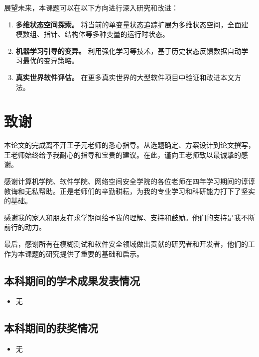 \documentclass[bachelor]{njupthesis}
\begin{document}
展望未来，本课题可以在以下方向进行深入研究和改进：

\begin{enumerate}
    \item \textbf{多维状态空间探索。} 将当前的单变量状态追踪扩展为多维状态空间，全面建模数组、指针、结构体等多种变量的运行时状态。
    \item \textbf{机器学习引导的变异。} 利用强化学习等技术，基于历史状态反馈数据自动学习最优的变异策略。
    \item \textbf{真实世界软件评估。} 在更多真实世界的大型软件项目中验证和改进本文方法。
\end{enumerate}

\thesisacknowledgement

\chapter*{致谢}

本论文的完成离不开王子元老师的悉心指导。从选题确定、方案设计到论文撰写，王老师始终给予我耐心的指导和宝贵的建议。在此，谨向王老师致以最诚挚的感谢。

感谢计算机学院、软件学院、网络空间安全学院的各位老师在四年学习期间的谆谆教诲和无私帮助。正是老师们的辛勤耕耘，为我的专业学习和科研能力打下了坚实的基础。

感谢我的家人和朋友在求学期间给予我的理解、支持和鼓励。他们的支持是我不断前行的动力。

最后，感谢所有在模糊测试和软件安全领域做出贡献的研究者和开发者，他们的工作为本课题的研究提供了重要的基础和启示。

\thesisreference

\thesisappendix

\section{本科期间的学术成果发表情况}
\begin{itemize}
    \item 无
\end{itemize}

\section{本科期间的获奖情况}
\begin{itemize}
    \item 无
\end{itemize}
\end{document}
